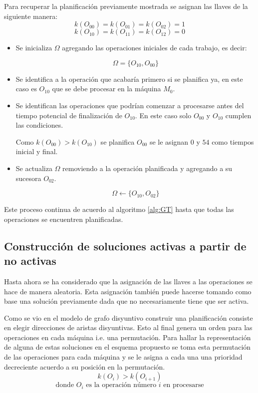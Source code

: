 Para recuperar la planificación previamente mostrada se asignan las llaves de la siguiente manera: \[k(O_{00})=k(O_{01})=k(O_{02})=1\]  \[k(O_{10})=k(O_{11})=k(O_{12})=0\]
\begin{itemize}
    \item Se inicializa $\Omega$ agregando las operaciones iniciales de cada trabajo, es decir:

\[\Omega = \{O_{10},O_{00}\}\]

     \item Se identifica a la operación que acabaría primero si se planifica ya, en este caso es $O_{10}$ que se debe procesar en la máquina $M_0$. 

     \item Se identifican las operaciones que podrían comenzar a procesarse antes del tiempo potencial de finalización de $O_{10}$. En este caso solo $O_{00}$ y  $O_{10}$ cumplen las condiciones.

Como $k(O_{00})>k(O_{10})$ se planifica $O_{00}$ se le asignan $0$ y $54$ como tiempos inicial y final.

     \item Se actualiza $\Omega$ removiendo a la operación planificada y agregando a su sucesora $O_{02}$.

\[\Omega\leftarrow \{O_{10},O_{02}\}\]
\end{itemize}
Este proceso continua de acuerdo al algoritmo \ref{alg:GT} hasta que todas las operaciones se encuentren planificadas.\\ 

\subsection{Construcción de soluciones activas a partir de no activas}

Hasta ahora se ha considerado que la asignación de las llaves a las operaciones se hace de manera aleatoria. Esta asignación también puede hacerse tomando como base una solución previamente dada que no necesariamente tiene que ser activa. 

Como se vio en el modelo de grafo disyuntivo construir una planificación consiste en elegir direcciones de aristas disyuntivas. Esto al final genera un orden para las operaciones en cada máquina i.e. una permutación. Para hallar la representación de alguna de estas soluciones en el esquema propuesto se toma esta permutación de las operaciones para cada máquina y se le asigna a cada una una prioridad decreciente acuerdo a su posición en la permutación.
\[k(O_i)>k(O_{i+1})\]
\[\text{donde }O_i\text{ es la operación número $i$ en procesarse}\]

